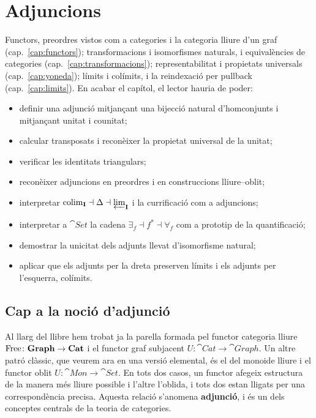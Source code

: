 \chapter[Adjuncions]{Adjuncions}
\label{cap:adjuncions}

\begin{objectius}
 Functors, preordres vistos com a categories i la categoria lliure d'un graf (cap.~\ref{cap:functors}); transformacions i isomorfismes naturals, i equivalències de categories (cap.~\ref{cap:transformacions}); representabilitat i propietats universals (cap.~\ref{cap:yoneda}); límits i colímits, i la reindexació per pullback (cap.~\ref{cap:limits}).
 En acabar el capítol, el lector hauria de poder:
\begin{itemize}
  \item definir una adjunció mitjançant una bijecció natural d'homconjunts i mitjançant unitat i counitat;
  \item calcular transposats i reconèixer la propietat universal de la unitat;
  \item verificar les identitats triangulars;
  \item reconèixer adjuncions en preordres i en construccions lliure--oblit;
  \item interpretar $\operatorname*{colim}_{\mathbf{I}}\dashv\Delta\dashv\varprojlim_{\mathbf{I}}$ i la currificació com a adjuncions;
  \item interpretar a $\cat{Set}$ la cadena $\exists_f\dashv f^{*}\dashv\forall_f$ com a prototip de la quantificació;
  \item demostrar la unicitat dels adjunts llevat d'isomorfisme natural;
  \item aplicar que els adjunts per la dreta preserven límits i els adjunts per l'esquerra, colímits.
\end{itemize}
\end{objectius}

\section{Cap a la noció d'adjunció}

Al llarg del llibre hem trobat ja la parella formada pel functor categoria lliure $\operatorname{Free}\colon\mathbf{Graph}\to\mathbf{Cat}$ i el functor graf subjacent $U\colon\cat{Cat}\to\cat{Graph}$. Un altre patró clàssic, que veurem ara en una versió elemental, és el del monoide lliure i el functor oblit $U\colon\cat{Mon}\to\cat{Set}$. En tots dos casos, un functor afegeix estructura de la manera més lliure possible i l'altre l'oblida, i tots dos estan lligats per una correspondència precisa. Aquesta relació s'anomena \textbf{adjunció}, i és un dels conceptes centrals de la teoria de categories.

